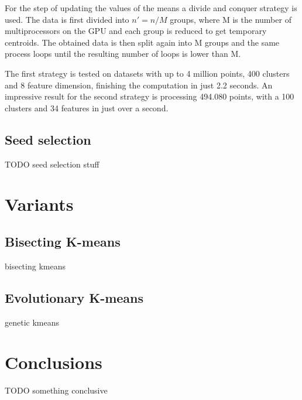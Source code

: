 \documentclass[12pt]{article}
\begin{document}
	For the step of updating the values of the means a divide and conquer strategy is used. The data is first divided into \(n'=n/M\) groups, where M is the number of multiprocessors on the GPU and each group is reduced to get temporary centroids. The obtained data is then split again into M groups and the same process loops until the resulting number of loops is lower than M.
	
	The first strategy is tested on datasets with up to 4 million points, 400 clusters and 8 feature dimension, finishing the computation in just 2.2 seconds. An impressive result for the second strategy is processing 494.080 points, with a 100 clusters and 34 features in just over a second.
	
	\subsection{Seed selection}
	TODO seed selection stuff
	
	\section{Variants}
	\subsection{Bisecting K-means} 
	bisecting kmeans
	
	\subsection{Evolutionary K-means }
	genetic kmeans
	
	
	\section{Conclusions}
	TODO something conclusive
	
	\newpage
	
	
\end{document}
